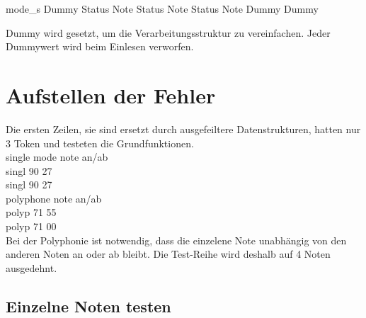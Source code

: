 mode\_s	\hspace{1mm} Dummy \hspace*{2mm} 	Status	\hspace*{2mm} Note \hspace*{2mm}  Status \hspace*{4mm} 	Note \hspace*{2mm} 	Status \hspace*{3mm} 	Note \hspace*{3mm} 	Dummy \hspace*{2mm}  Dummy

Dummy wird gesetzt, um die Verarbeitungsstruktur zu vereinfachen. Jeder Dummywert wird beim Einlesen verworfen.\\
 
\section{Aufstellen der Fehler}\label{sec.testbench_fehler} 
Die ersten Zeilen, sie sind ersetzt durch ausgefeiltere Datenstrukturen, hatten nur 3 Token und testeten die Grundfunktionen.\\

single mode note an/ab\\
singl 90 27\\ 
singl 90 27\\

polyphone note an/ab\\
polyp 71 55\\
polyp 71 00\\

Bei der Polyphonie ist notwendig, dass die einzelene Note unabhängig von den anderen Noten an oder ab bleibt. Die Test-Reihe wird deshalb auf 4 Noten ausgedehnt.


\subsection{Einzelne Noten testen}
 
